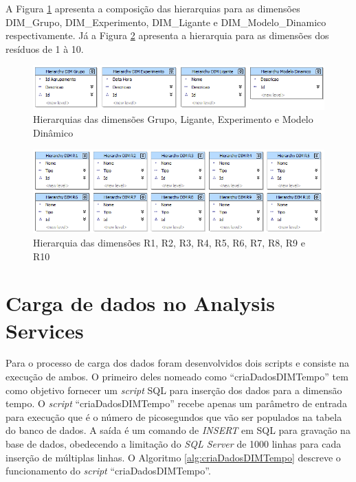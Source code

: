 A Figura \ref{fig:hierarGrupoLiganteExperimentoModelo} apresenta a composição das hierarquias para as dimensões DIM\_Grupo, DIM\_Experimento, DIM\_Ligante e DIM\_Modelo\_Dinamico respectivamente. Já a Figura \ref{fig:HierarR1ateR10} apresenta a hierarquia para as dimensões dos resíduos de 1 à 10.

\begin{figure}[h]
        \center
        \includegraphics[scale=0.6]{images/Hierar_Grupo_Ligante_Experimento_Modelo.png}
        \caption{Hierarquias das dimensões Grupo, Ligante, Experimento e Modelo Dinâmico}
        \label{fig:hierarGrupoLiganteExperimentoModelo}
\end{figure}

\begin{figure}[h]
        \center
        \includegraphics[scale=0.6]{images/Hierar_DIMR1_ate_10.png}
        \caption{Hierarquia das dimensões R1, R2, R3, R4, R5, R6, R7, R8, R9 e R10}
        \label{fig:HierarR1ateR10}
\end{figure}	

\section{Carga de dados no Analysis Services}
\label{sec:CargaDeDadosNoAnalysisServices}

Para o processo de carga dos dados foram desenvolvidos dois scripts e consiste na execução de ambos. O primeiro deles nomeado como ``criaDadosDIMTempo'' tem como objetivo fornecer um \emph{script} SQL para inserção dos dados para a dimensão tempo. O \emph{script} ``criaDadosDIMTempo'' recebe apenas um parâmetro de entrada para execução que é o número de picosegundos que vão ser populados na tabela do banco de dados. A saída é um comando de \emph{INSERT} em SQL para gravação na base de dados, obedecendo a limitação do \emph{SQL Server} de 1000 linhas para cada inserção de múltiplas linhas. O Algoritmo \ref{alg:criaDadosDIMTempo} descreve o funcionamento do \emph{script} ``criaDadosDIMTempo''. 

